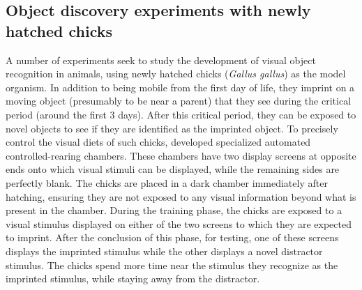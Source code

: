 \documentclass[10pt,letterpaper]{article}
\begin{document}
\subsection{Object discovery experiments with newly hatched chicks \label{chicks}}

A number of experiments seek to study the development of visual object recognition in animals, using newly hatched chicks (\textit{Gallus gallus}) as the model organism. In addition to being mobile from the first day of life, they imprint on a moving object (presumably to be near a parent) that they see during the critical period (around the first 3 days). After this critical period, they can be exposed to novel objects to see if they are identified as the imprinted object. To precisely control the visual diets of such chicks, \cite{wood2013newborn, wood2015chicken} developed specialized automated controlled-rearing chambers. These chambers have two display screens at opposite ends onto which visual stimuli can be displayed, while the remaining sides are perfectly blank. The chicks are placed in a dark chamber immediately after hatching, ensuring they are not exposed to any visual information beyond what is present in the chamber. During the training phase, the chicks are exposed to a visual stimulus displayed on either of the two screens to which they are expected to imprint. After the conclusion of this phase, for testing, one of these screens displays the imprinted stimulus while the other displays a novel distractor stimulus. The chicks spend more time near the stimulus they recognize as the imprinted stimulus, while staying away from the distractor.

\end{document}
